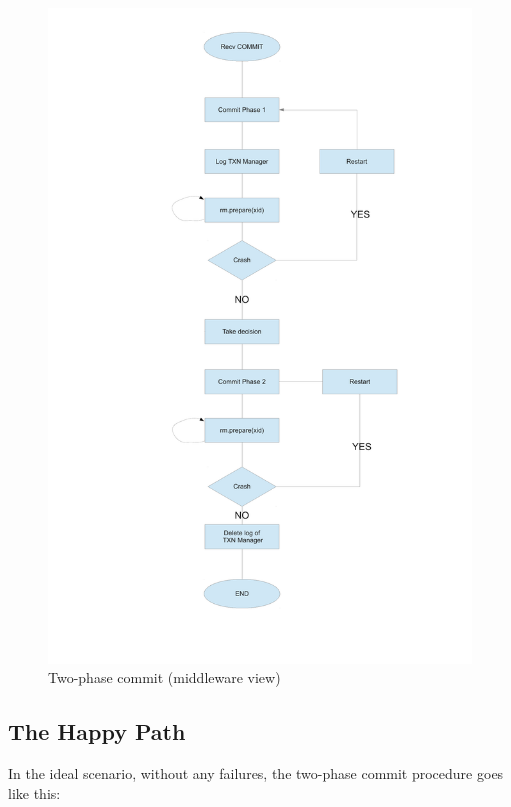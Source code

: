 \documentclass[11pt]{article}
\begin{document}
\begin{figure}[H]
  \caption{Two-phase commit (middleware view)}
  \label{fig:2pc-mw}

  \begin{center}
    \includegraphics[scale=0.6]{2pc-mw.pdf}
  \end{center}
\end{figure}


\subsection{The Happy Path}

In the ideal scenario, without any failures, the two-phase commit
procedure goes like this:
\end{document}
